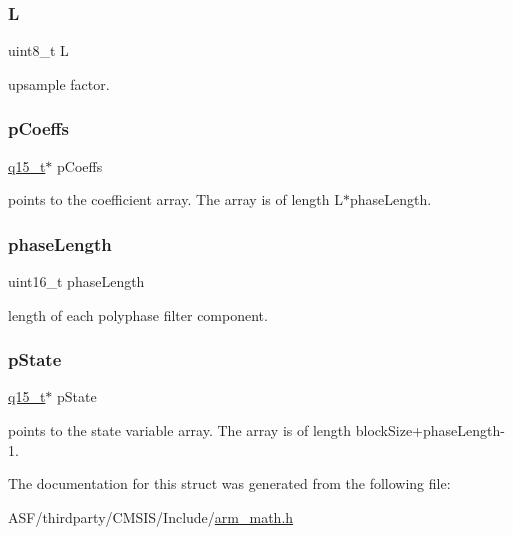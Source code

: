 \subsubsection{\texorpdfstring{L}{L}}
{\footnotesize\ttfamily uint8\+\_\+t L}

upsample factor. \mbox{\label{structarm__fir__interpolate__instance__q15_a7ca181a37f714d174445f486bebce26f}} 
\subsubsection{\texorpdfstring{pCoeffs}{pCoeffs}}
{\footnotesize\ttfamily \mbox{\hyperlink{arm__math_8h_ab5a8fb21a5b3b983d5f54f31614052ea}{q15\+\_\+t}}$\ast$ p\+Coeffs}

points to the coefficient array. The array is of length L$\ast$phase\+Length. \mbox{\label{structarm__fir__interpolate__instance__q15_a8f92bb07e0812f94679438cdf412b26a}} 
\subsubsection{\texorpdfstring{phaseLength}{phaseLength}}
{\footnotesize\ttfamily uint16\+\_\+t phase\+Length}

length of each polyphase filter component. \mbox{\label{structarm__fir__interpolate__instance__q15_ae29dfdb736374fcddaeaec4b7770170c}} 
\subsubsection{\texorpdfstring{pState}{pState}}
{\footnotesize\ttfamily \mbox{\hyperlink{arm__math_8h_ab5a8fb21a5b3b983d5f54f31614052ea}{q15\+\_\+t}}$\ast$ p\+State}

points to the state variable array. The array is of length block\+Size+phase\+Length-\/1. 

The documentation for this struct was generated from the following file\+:\begin{DoxyCompactItemize}
\item 
A\+S\+F/thirdparty/\+C\+M\+S\+I\+S/\+Include/\mbox{\hyperlink{arm__math_8h}{arm\+\_\+math.\+h}}\end{DoxyCompactItemize}
